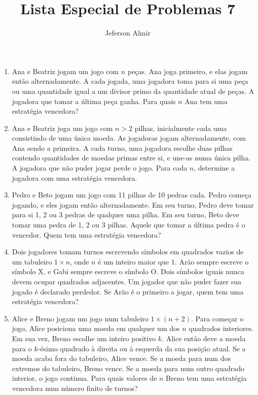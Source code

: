 \documentclass{article}
\title{Lista Especial de Problemas 7}
\author{Jeferson Almir}
\date{}
\begin{document}
\maketitle

\begin{enumerate}
    \item Ana e Beatriz jogam um jogo com $n$ peças.
    Ana joga primeiro, e elas jogam então alternadamente.
    A cada jogada, uma jogadora toma para si uma peça
    ou uma quantidade igual a um divisor primo da quantidade atual de peças.
    A jogadora que tomar a última peça ganha.
    Para quais $n$ Ana tem uma estratégia vencedora?
    
    \item Ana e Beatriz joga um jogo com $n>2$ pilhas,
    inicialmente cada uma consistindo de uma única moeda.
    As jogadoras jogam alternadamente, com Ana sendo a primeira.
    A cada turno, uma jogadora escolhe duas pilhas contendo quantidades de moedas primas entre si,
    e une-as numa única pilha.
    A jogadora que não puder jogar perde o jogo.
    Para cada $n$, determine a jogadora com uma estratégia vencedora.
    
    \item Pedro e Beto jogam um jogo com 11 pilhas de 10 pedras cada.
    Pedro começa jogando, e eles jogam então alternadamente.
    Em seu turno, Pedro deve tomar para si 1, 2 ou 3 pedras de qualquer uma pilha.
    Em seu turno, Beto deve tomar uma pedra de 1, 2 ou 3 pilhas.
    Aquele que tomar a última pedra é o vencedor.
    Quem tem uma estratégia vencedora?
    
    \item Dois jogadores tomam turnos escrevendo símbolos em quadrados vazios de um tabuleiro $1\times n$,
    onde $n$ é um inteiro maior que $1$.
    Arão sempre escreve o símbolo X,
    e Gabi sempre escreve o símbolo O.
    Dois símbolos iguais nunca devem ocupar quadrados adjacentes.
    Um jogador que não puder fazer sua jogado é declarado perdedor.
    Se Arão é o primeiro a jogar,
    quem tem uma estratégia vencedora?
    
    \item Alice e Breno jogam um jogo num tabuleiro $1\times (n+2)$.
    Para começar o jogo,
    Alice posiciona uma moeda em qualquer um dos $n$ quadrados interiores.
    Em sua vez, Breno escolhe um inteiro positivo $k$.
    Alice então deve a moeda para o $k$-ésimo quadrado à direita ou à esquerda da sua posição atual.
    Se a moeda acaba fora do tabuleiro, Alice vence.
    Se a moeda para num dos extremos do tabuleiro, Breno vence.
    Se a moeda para num outro quadrado interior, o jogo continua.
    Para quais valores de $n$ Breno tem uma estratégia vencedora num número finito de turnos?
    

\end{enumerate}
\end{document}
